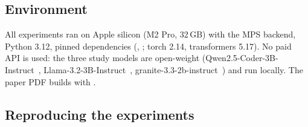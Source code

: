 \subsection{Environment}
All experiments ran on Apple silicon (M2 Pro, 32\,GB) with the MPS backend,
Python 3.12, pinned dependencies (,
; torch 2.14, transformers 5.17). No paid API is
used: the three study models are open-weight
(Qwen2.5-Coder-3B-Instruct~\cite{hui2024qwen25coder},
Llama-3.2-3B-Instruct~\cite{grattafiori2024llama3},
granite-3.3-2b-instruct~\cite{granite2025modelcard}) and run locally.
The paper PDF builds with .

\subsection{Reproducing the experiments}
